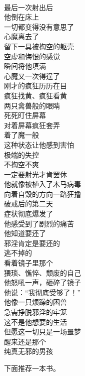 \begin{poem}[邪淫半兽人]
    \begin{multicols}{3}
        \centering~\\
        最后一次射出后 \\ 他倒在床上 \\ 一切都变得没有意思了 \\ 心魔离去了 \\ 留下一具被掏空的躯壳 \\ 空虚和悔恨的感觉 \\ 瞬间将他填满 \\ 心魔又一次得逞了 \\ 刚才的疯狂历历在目 \\ 疯狂找黄、疯狂看黄 \\ 两只禽兽般的眼睛 \\ 死死盯住屏幕 \\ 对着屏幕疯狂套弄 \\ 着了魔一般 \\ 这种状态让他感到害怕 \\ 极端的失控 \\ 不掏空不爽 \\ 一定要射光才肯罢休 \\ 他就像被植入了木马病毒 \\ 向着自毁的方向一路狂撸 \\ 破戒后的第二天 \\ 症状彻底爆发了 \\ 他感受到了剧烈的痛苦 \\ 他知道要还了 \\ 邪淫肯定是要还的 \\ 逃不掉的 \\ 看着镜子里那个 \\ 猥琐、憔悴、颓废的自己 \\ 他怒吼一声，砸碎了镜子 \\ 他说：“我彻底受够了！” \\ 他像一只烦躁的困兽 \\ 急需挣脱邪淫的牢笼 \\ 这不是他想要的生活 \\ 但愿这一切只是一场噩梦 \\ 醒来还是那个 \\ 纯真无邪的男孩
    \end{multicols}
\end{poem}

下面推荐一本书。


